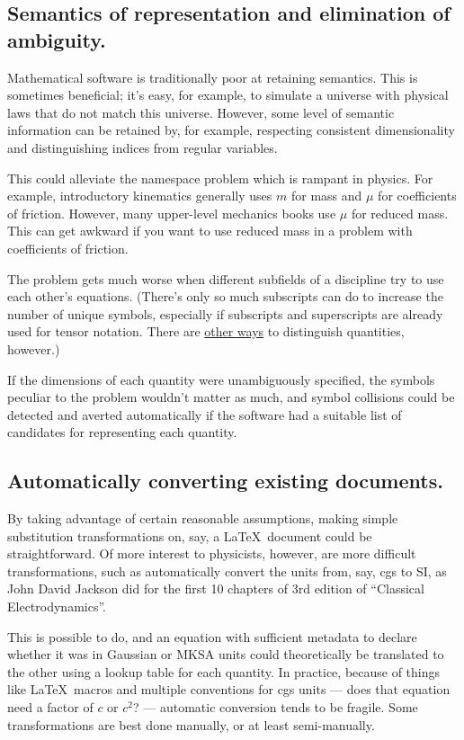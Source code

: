 \documentclass[12pt,letterpaper]{article}
\begin{document}
\subsection{Semantics of representation and elimination of ambiguity.}

Mathematical software is traditionally poor at retaining semantics.
This is sometimes beneficial;
it's easy, for example,
to simulate a universe with physical laws that do not match this universe.
However, some level of semantic information can be retained by,
for example, respecting consistent dimensionality and distinguishing indices from regular variables.

This could alleviate the namespace problem which is rampant in physics.
For example,
introductory kinematics generally uses $m$ for mass and $\mu$ for coefficients of friction.
However, many upper-level mechanics books use $\mu$ for reduced mass.
This can get awkward if you want to use reduced mass in a problem with coefficients of friction.

The problem gets much worse when different subfields of a discipline try to use each other's equations.
(There's only so much subscripts can do to increase the number of unique symbols,
especially if subscripts and superscripts are already used for tensor notation.
There are \hyperref[color-coding]{other ways} to distinguish quantities, however.)

If the dimensions of each quantity were unambiguously specified,
the symbols peculiar to the problem wouldn't matter as much,
and symbol collisions could be detected and averted automatically
if the software had a suitable list of candidates for representing each quantity.

\subsection{Automatically converting existing documents.}

By taking advantage of certain reasonable assumptions,
making simple substitution transformations on, say,
a \LaTeX\ document could be straightforward.
Of more interest to physicists, however,
are more difficult transformations,
such as automatically convert the units from,
say, cgs to SI,
as John David Jackson did for the first 10 chapters of 3rd edition of ``Classical Electrodynamics''.

This is possible to do,
and an equation with sufficient metadata to declare whether it was in Gaussian or MKSA units
could theoretically be translated to the other using a lookup table for each quantity.
In practice,
because of things like \LaTeX\ macros and multiple conventions for cgs units
--- does that equation need a factor of $c$ or $c^2$? ---
automatic conversion tends to be fragile.
Some transformations are best done manually,
or at least semi-manually.
\end{document}
